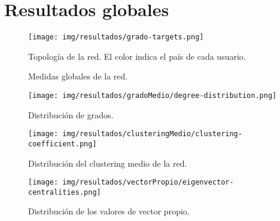 \section{Resultados globales}

\begin{figure}[ht]
    \centerfloat
    \texttt{[image: img/resultados/grado-targets.png]}
    \caption{Topología de la red. El color indica el país de cada usuario.}
\end{figure}

\begin{figure}[t]
    \centering
    \caption{Medidas globales de la red.}
\end{figure}

\begin{figure}[ht]
    \centerfloat
    \texttt{[image: img/resultados/gradoMedio/degree-distribution.png]}
    \caption{Distribución de grados.}
\end{figure}

\begin{figure}[ht]
    \centerfloat
    \texttt{[image: img/resultados/clusteringMedio/clustering-coefficient.png]}
    \caption{Distribución del clustering medio de la red.}
\end{figure}

\begin{figure}[ht]
    \centerfloat
    \texttt{[image: img/resultados/vectorPropio/eigenvector-centralities.png]}
    \caption{Distribución de los valores de vector propio.}
\end{figure}